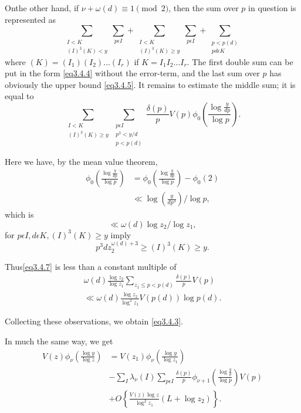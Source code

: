 On\pageoriginale the other hand, if $\nu + \omega (d) \equiv 1 \pmod{2}$, then the
sum over $p$ in question is represented as 
\begin{equation*}
  \sum_{\substack{I<K\\ (I)^3 (K) < y}} \sum_{p \epsilon  I} +
  \sum_{\substack{I<K\\ (I)^3 (K) \geq y}}\sum_{p \epsilon  I} +
  \sum_{\substack{p < p (d) \\ pd \epsilon  K}} \tag{3.4.6} \label{eq3.4.6}
\end{equation*}
where $(K) = (I_1)(I_2) \ldots (I_r)$ if $K = I_1 I_2 \ldots I_r$. The
first double sum can be put in the form \eqref{eq3.4.4} without the
error-term, and the last sum over $p$ has obviously the upper bound
\eqref{eq3.4.5}. It remains to estimate the middle sum; it is equal to  
\begin{equation*}
  \sum_{\substack{I < K \\ (I)^3 (K) \geq y}} \sum_{\substack{ p
      \epsilon  I\\ p^{3} < y / d\\ p < p (d)}}\frac{\delta(p)}{p}
  V(p) \phi_0 \left( \frac{\log \frac{y}{dp}}{\log
    p}\right). \tag{3.4.7} \label{eq3.4.7} 
\end{equation*}

Here we have, by the mean value theorem,
\begin{align*}
  \phi_0 \left( \frac{\log \frac{y}{dp}} {\log p}\right) 
  & = \phi_0 \left(\frac{\log \frac{y}{dp}} {\log p}\right) - \phi_0 (2)\\ 
  &  \ll \log \left(\frac{y}{dp^3}\right)/ \log p,
\end{align*}
which is
$$
\ll \omega (d) \log z_2 / \log z_1,
$$
for $p \epsilon  I, d \epsilon  K, (I)^3 (K) \geq y$ imply
$$
p^3 dz^{\omega (d) + 3}_2 \geq (I)^3 (K) \geq y.
$$

Thus\pageoriginale \eqref{eq3.4.7} is less than a constant multiple of 
\begin{gather*}
  \omega (d) \frac{\log z_2}{\log z_1} \sum_{ z_1  \leq p < p (d)}
  \frac{\delta (p)}{p} V(p) \\ 
  \ll \omega(d) \frac{\log z_2}{\log^2 z_1} V(p(d)) \log p(d).
\end{gather*}

Collecting these observations, we obtain \eqref{eq3.4.3}.

In much the same way, we get
\begin{align*}
  V(z) \phi_\nu \left(\frac{\log y}{\log z}\right) &= V(z_1) \phi_\nu
  \left(\frac{\log y}{\log z_1}\right) \\
  & -\sum_I \lambda_\nu (I) \sum_{p \epsilon  I} \frac{\delta (p)}{p}
  \phi_{\nu + 1} \left(\frac{\log \frac{y}{p}}{\log p}\right) V(p)\\ 
  & + O\left\{ \frac{V(z) \log z}{\log^2 z_1} (L + \log z_2) \right\}. 
\end{align*}

